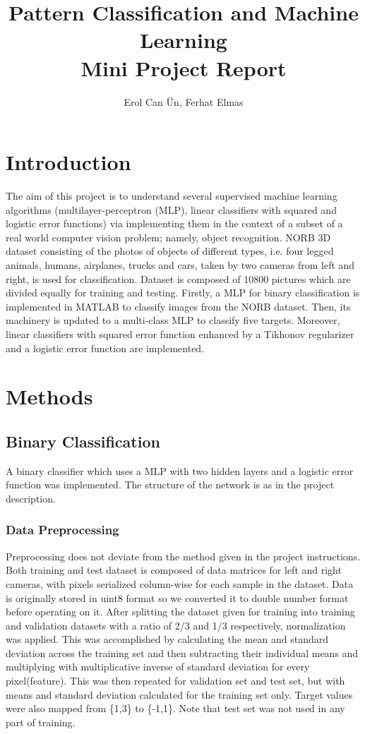 \documentclass[10pt]{article}
\title{Pattern Classification and Machine Learning\\Mini Project Report}
\author{Erol Can Ün, Ferhat Elmas}
\begin{document}
\maketitle

\section{Introduction}
The aim of this project is to understand several supervised machine learning algorithms (multilayer-perceptron (MLP), linear classifiers with squared and logistic error functions) via implementing them in the context of a subset of a real world computer vision problem; namely, object recognition. NORB 3D dataset consisting of the photos of objects of different types, i.e. four legged animals, humans, airplanes, trucks and cars, taken by two cameras from left and right, is used for classification. Dataset is composed of 10800 pictures which are divided equally for training and testing. Firstly, a MLP for binary  classification is implemented in MATLAB to classify images from the NORB dataset. Then, its machinery is updated to a multi-class MLP to classify five targets. Moreover, linear classifiers with squared error function enhanced by a Tikhonov regularizer and a logistic error function are implemented.

\section{Methods}
\subsection{Binary Classification}
A binary classifier which uses a MLP with two hidden layers and a logistic error function was implemented. The structure of the network is as in the project description.

\subsubsection{Data Preprocessing}
Preprocessing does not deviate from the method given in the project instructions. Both training and test dataset is composed of data matrices for left and right cameras, with pixels serialized column-wise for each sample in the dataset. Data is originally stored in uint8 format so we converted it to double number format before operating on it. After splitting the dataset given for training into training and validation datasets with a ratio of 2/3 and 1/3 respectively, normalization was applied. This was accomplished by calculating the mean and standard deviation across the training set and then subtracting their individual means and multiplying with multiplicative inverse of standard deviation for every pixel(feature). This was then repeated for validation set and test set, but with means and standard deviation calculated for the training set only. Target values were also mapped from \{1,3\} to \{-1,1\}. Note that test set was not used in any part of training.
\end{document}
